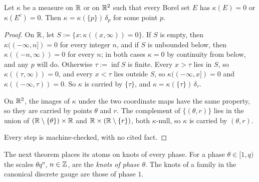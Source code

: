 \begin{lemma}
\label{lem:null-conull-point-mass}

Let $\kappa$ be a measure on $\mathbb{R}$ or on $\mathbb{R}^2$ such that every Borel set $E$ has $\kappa(E) = 0$
or $\kappa(E^c) = 0$. Then $\kappa = \kappa(\{p\})\,\delta_p$ for some point $p$.
\end{lemma}

\begin{proof}
On $\mathbb{R}$, let $S := \{x : \kappa((x,\infty)) = 0\}$. If $S$ is empty, then
$\kappa((-\infty, n]) = 0$ for every integer $n$, and if $S$ is unbounded below, then
$\kappa((-n,\infty)) = 0$ for every $n$; in both cases $\kappa = 0$ by continuity from below, and
any $p$ will do. Otherwise $\tau := \inf S$ is finite. Every $x > \tau$ lies in $S$, so
$\kappa((\tau,\infty)) = 0$, and every $x < \tau$ lies outside $S$, so $\kappa((-\infty,x]) = 0$ and
$\kappa((-\infty,\tau)) = 0$. So $\kappa$ is carried by $\{\tau\}$, and $\kappa = \kappa(\{\tau\})\,
\delta_\tau$.

On $\mathbb{R}^2$, the images of $\kappa$ under the two coordinate maps have the same property, so they are
carried by points $\theta$ and $r$. The complement of $\{(\theta, r)\}$ lies in the union of
$(\mathbb{R} \setminus \{\theta\}) \times \mathbb{R}$ and $\mathbb{R} \times (\mathbb{R} \setminus \{r\})$, both $\kappa$-null,
so $\kappa$ is carried by $(\theta, r)$.

Every step is machine-checked, with no cited fact.
\end{proof}

The next theorem places its atoms on knots of every phase. For a phase $\theta \in [1,q)$ the
scales $\theta q^n$, $n \in \mathbb{Z}$, are the \emph{knots of phase $\theta$}. The knots of a family in
the canonical discrete gauge are those of phase $1$.

